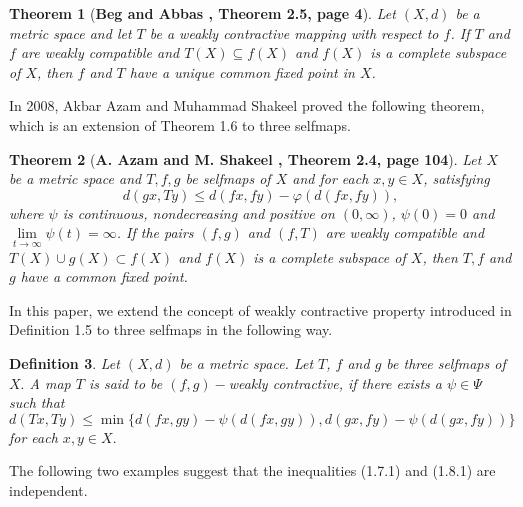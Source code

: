\documentclass[11]{article}
\newtheorem{definition}{Definition}[section]
\newtheorem{theorem}[definition]{Theorem}
\numberwithin{equation}{definition}
\begin{document}
\begin{theorem}[\textbf{Beg and Abbas \cite{Beg2006}, Theorem 2.5, page 4}]
Let $(X,d)$ be a metric space and let $T$ be a weakly contractive mapping with respect to $f$. If $T$ and $f$ are weakly compatible and $T(X)\subseteq f(X)$ and $f(X)$ is a complete subspace of $X$, then $f$ and $T$ have a unique common fixed point in $X$.
\end{theorem}

In 2008, Akbar Azam and Muhammad Shakeel \cite{Azam2008} proved the following theorem, which is an extension of Theorem 1.6 to three selfmaps.

\begin{theorem}[\textbf{A. Azam and M. Shakeel \cite{Azam2008}, Theorem 2.4, page 104}]
Let $X$ be a metric space and $T,f,g$ be selfmaps of $X$ and for each $x,y\in X$, satisfying
\begin{equation}
d(gx,Ty)\leq d(fx,fy)-\varphi(d(fx,fy)),
\end{equation}
where $\psi$ is continuous, nondecreasing and positive on $(0,\infty)$, $\psi(0)=0$ and $\lim\limits_{t\rightarrow\infty}\psi(t)=\infty$. If the pairs $(f,g)$ and $(f,T)$ are weakly compatible and $T(X)\cup g(X)\subset f(X)$ and $f(X)$ is a complete subspace of $X$, then $T,f$ and $g$ have a common fixed point.
\end{theorem}

In this paper, we extend the concept of weakly contractive property introduced in Definition 1.5 to three selfmaps in the following way.

\begin{definition}
Let $(X,d)$ be a metric space. Let $T$, $f$ and $g$ be three selfmaps of $X.$ A map $T$ is said to be $(f,g)-$\emph{weakly contractive}, if there exists a $\psi\in\Psi$ such that
\begin{equation}
d(Tx,Ty)\leq\min\{d(fx,gy)-\psi(d(fx,gy)),d(gx,fy)-\psi(d(gx,fy))\}
\end{equation}
for each $x,y\in X.$
\end{definition}

The following two examples suggest that the inequalities (1.7.1) and (1.8.1) are independent.
\end{document}
